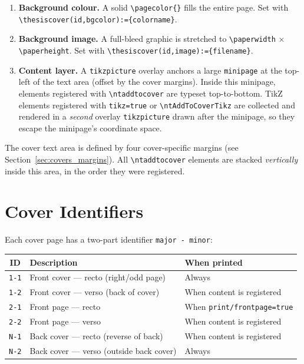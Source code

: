 \begin{enumerate}
  \item \textbf{Background colour.}  A solid \verb!\pagecolor{}! fills the
        entire page.  Set with \verb!\thesiscover(id,bgcolor):={colorname}!.
  \item \textbf{Background image.}  A full-bleed graphic is stretched to
        \verb!\paperwidth! $\times$ \verb!\paperheight!.  Set with
        \verb!\thesiscover(id,image):={filename}!.
  \item \textbf{Content layer.}  A \verb!tikzpicture! overlay anchors a
        large \verb!minipage! at the top-left of the text area (offset by the
        cover margins).  Inside this minipage, elements registered with
        \verb!\ntaddtocover! are typeset top-to-bottom.  TikZ elements
        registered with \verb!tikz=true! or \verb!\ntAddToCoverTikz! are
        collected and rendered in a \emph{second} overlay \verb!tikzpicture!
        drawn after the minipage, so they escape the minipage's coordinate
        space.
\end{enumerate}

The cover text area is defined by four cover-specific margins (see
Section~\ref{sec:covers_margins}).  All \verb!\ntaddtocover! elements are
stacked \emph{vertically} inside this area, in the order they were
registered.


\section{Cover Identifiers}
\label{sec:cover_ids}

Each cover page has a two-part identifier \texttt{major\,-\,minor}:

\begin{center}
\begin{tabular}{cll}
  \hline
  \textbf{ID} & \textbf{Description} & \textbf{When printed} \\
  \hline
  \texttt{1-1} & Front cover — recto (right/odd page)   & Always \\
  \texttt{1-2} & Front cover — verso (back of cover)    & When content is registered \\
  \texttt{2-1} & Front page — recto                     & When \texttt{print/frontpage=true} \\
  \texttt{2-2} & Front page — verso                     & When content is registered \\
  \texttt{N-1} & Back cover — recto (reverse of back)   & When content is registered \\
  \texttt{N-2} & Back cover — verso (outside back cover) & Always \\
  \hline
\end{tabular}
\end{center}

